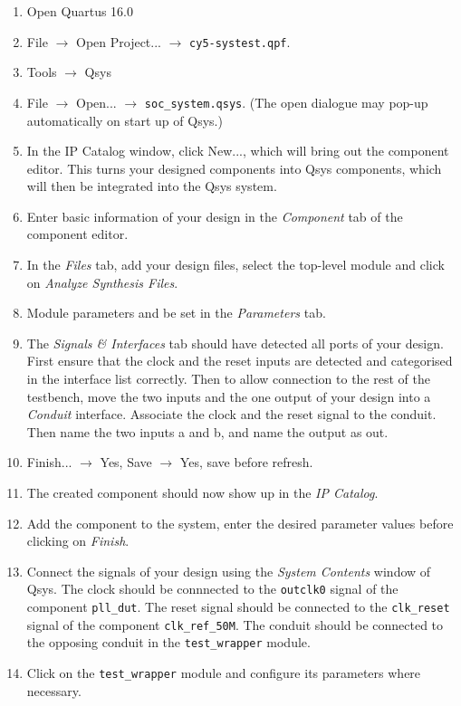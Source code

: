 \begin{enumerate}
  \item Open Quartus 16.0
  \item File $\rightarrow$ Open Project... $\rightarrow$ \texttt{cy5-systest.qpf}.
  \item Tools $\rightarrow$ Qsys
  \item File $\rightarrow$ Open... $\rightarrow$ \texttt{soc\_system.qsys}.
        (The open dialogue may pop-up automatically on start up of Qsys.)
  \item In the IP Catalog window, click New..., which will bring out the component editor.
        This turns your designed components into Qsys components, which will then be integrated into the Qsys system.
  \item Enter basic information of your design in the \textit{Component} tab of the component editor.
  \item In the \textit{Files} tab, add your design files, select the top-level module and click on \textit{Analyze Synthesis Files}.
  \item Module parameters and be set in the \textit{Parameters} tab.
  \item The \textit{Signals \& Interfaces} tab should have detected all ports of your design.
        First ensure that the clock and the reset inputs are detected and categorised in the interface list correctly.
        Then to allow connection to the rest of the testbench, move the two inputs and the one output of your design into a \textit{Conduit} interface.
        Associate the clock and the reset signal to the conduit.
        Then name the two inputs a and b, and name the output as out.
  \item Finish... $\rightarrow$ Yes, Save $\rightarrow$ Yes, save before refresh.
  \item The created component should now show up in the \textit{IP Catalog}.
  \item Add the component to the system, enter the desired parameter values before clicking on \textit{Finish}.
  \item Connect the signals of your design using the \textit{System Contents} window of Qsys.
        The clock should be connnected to the \texttt{outclk0} signal of the component \texttt{pll\_dut}.
        The reset signal should be connected to the \texttt{clk\_reset} signal of the component \texttt{clk\_ref\_50M}.
        The conduit should be connected to the opposing conduit in the \texttt{test\_wrapper} module.
  \item Click on the \texttt{test\_wrapper} module and configure its parameters where necessary.

\end{enumerate}
